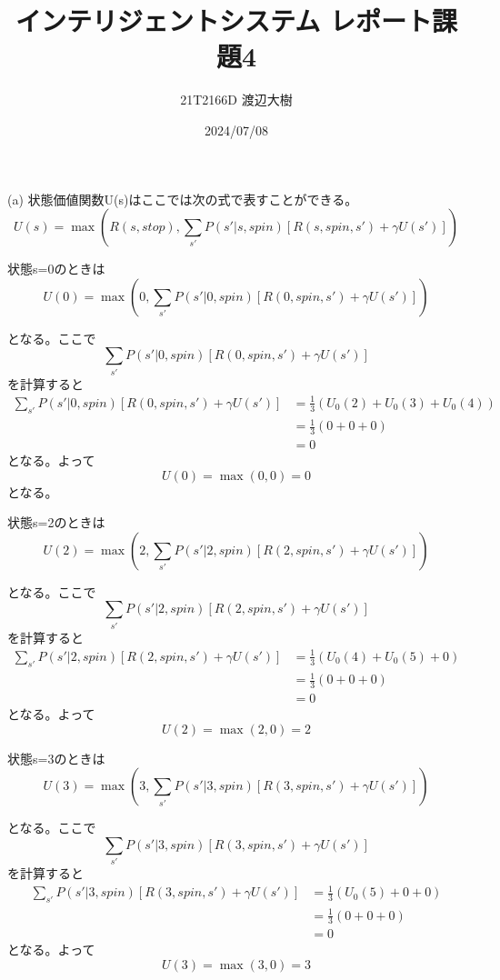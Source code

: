 \documentclass[a4paper,11pt,dvipdfmx]{jsarticle}
\begin{document}
\title{インテリジェントシステム レポート課題4}
\author{21T2166D 渡辺大樹}
\date{2024/07/08}
\maketitle

\section{}
(a)
状態価値関数U(s)はここでは次の式で表すことができる。
\[U(s)=\max(R(s,stop), \sum_{s'}P(s'|s,spin)[R(s,spin,s')+\gamma U(s')])\]

状態s=0のときは
\[U(0)=\max(0, \sum_{s'}P(s'|0,spin)[R(0,spin,s')+\gamma U(s')])\]

となる。ここで
\[\sum_{s'}P(s'|0,spin)[R(0,spin,s')+\gamma U(s')]\]
を計算すると
\begin{align*}
    \sum_{s'}P(s'|0,spin)[R(0,spin,s')+\gamma U(s')] &= \frac{1}{3}(U_0(2)+U_0(3)+U_0(4)) \\
                                                     &= \frac{1}{3}(0+0+0) \\
                                                     &= 0
\end{align*}
となる。よって
\[U(0)=\max(0,0)=0\]
となる。

状態s=2のときは
\[U(2)=\max(2, \sum_{s'}P(s'|2,spin)[R(2,spin,s')+\gamma U(s')])\]

となる。ここで
\[\sum_{s'}P(s'|2,spin)[R(2,spin,s')+\gamma U(s')]\]
を計算すると
\begin{align*}
    \sum_{s'}P(s'|2,spin)[R(2,spin,s')+\gamma U(s')] &= \frac{1}{3}(U_0(4)+U_0(5)+0) \\
                                                     &= \frac{1}{3}(0+0+0) \\
                                                     &= 0
\end{align*}
となる。よって
\[U(2)=\max(2,0)=2\]

状態s=3のときは
\[U(3)=\max(3, \sum_{s'}P(s'|3,spin)[R(3,spin,s')+\gamma U(s')])\]

となる。ここで
\[\sum_{s'}P(s'|3,spin)[R(3,spin,s')+\gamma U(s')]\]
を計算すると
\begin{align*}
    \sum_{s'}P(s'|3,spin)[R(3,spin,s')+\gamma U(s')] &= \frac{1}{3}(U_0(5)+0+0) \\
                                                     &= \frac{1}{3}(0+0+0) \\
                                                     &= 0
\end{align*}
となる。よって
\[U(3)=\max(3,0)=3\]
\end{document}
